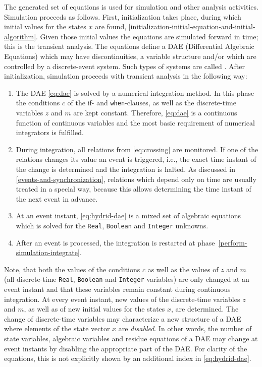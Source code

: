The generated set of equations is used for simulation and other analysis activities.
Simulation proceeds as follows.
First, initialization takes place, during which initial values for the states $x$ are found, \cref{initialization-initial-equation-and-initial-algorithm}.
Given those initial values the equations are simulated forward in time; this is the transient analysis.
The equations define a DAE (Differential Algebraic Equations) which may have discontinuities, a variable structure and/or which are controlled by a discrete-event system.
Such types of systems are called .
After initialization, simulation proceeds with transient analysis in the following way:
\begin{enumerate}
\item\label{perform-simulation-integrate}
  The DAE \eqref{eq:dae} is solved by a numerical integration method.
  In this phase the conditions $c$ of the if- and \lstinline!when!-clauses, as well as the discrete-time variables $z$ and $m$ are kept constant.
  Therefore, \eqref{eq:dae} is a continuous function of continuous variables and the most basic requirement of numerical integrators is fulfilled.
\item
  During integration, all relations from \eqref{eq:crossing} are monitored.
  If one of the relations changes its value an event is triggered, i.e., the exact time instant of the change is determined and the integration is halted.
  As discussed in \cref{events-and-synchronization}, relations which depend only on time are usually treated in a special way, because this allows determining the time instant of the next event in advance.
\item
  At an event instant, \eqref{eq:hydrid-dae} is a mixed set of algebraic equations which is solved for the \lstinline!Real!, \lstinline!Boolean! and \lstinline!Integer! unknowns.
\item
  After an event is processed, the integration is restarted at phase~\ref{perform-simulation-integrate}.
\end{enumerate}

Note, that both the values of the conditions $c$ as well as the values of $z$ and $m$ (all discrete-time \lstinline!Real!, \lstinline!Boolean! and \lstinline!Integer! variables) are only changed at an event instant and that these variables remain constant during continuous integration.
At every event instant, new values of the discrete-time variables $z$ and $m$, as well as of new initial values for the states $x$, are determined.
The change of discrete-time variables may characterize a new structure of a DAE where elements of the state vector $x$ are \emph{disabled}.
In other words, the number of state variables, algebraic variables and residue equations of a DAE may change at event instants by disabling the appropriate part of the DAE.
For clarity of the equations, this is not explicitly shown by an additional index in \eqref{eq:hydrid-dae}.

